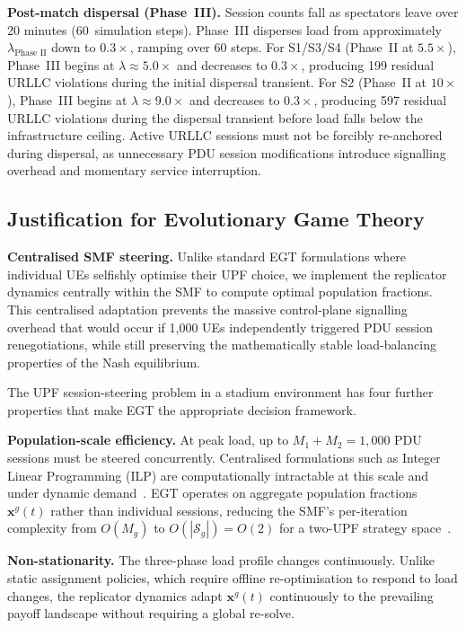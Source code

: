 \documentclass[conference]{IEEEtran}
\begin{document}
\textbf{Post-match dispersal (Phase~III).} Session
counts fall as spectators leave over 20 minutes
(60~simulation steps). Phase~III disperses load from
approximately $\lambda_{\text{Phase~II}}$ down to $0.3\times$,
ramping over 60 steps. For S1/S3/S4 (Phase~II at
$5.5\times$), Phase~III begins at $\lambda \approx 5.0\times$
and decreases to $0.3\times$, producing 199 residual URLLC
violations during the initial dispersal transient. For S2
(Phase~II at $10\times$), Phase~III begins at $\lambda \approx
9.0\times$ and decreases to $0.3\times$, producing 597 residual
URLLC violations during the dispersal transient before load
falls below the infrastructure ceiling. Active
URLLC sessions must not be forcibly re-anchored
during dispersal, as unnecessary PDU session
modifications introduce signalling overhead and
momentary service interruption.

\subsection{Justification for Evolutionary Game Theory}
\label{sec:egt_justify}

\textbf{Centralised SMF steering.}
Unlike standard EGT formulations where individual UEs selfishly
optimise their UPF choice, we implement the replicator dynamics
centrally within the SMF to compute optimal population fractions.
This centralised adaptation prevents the massive control-plane
signalling overhead that would occur if 1,000 UEs independently
triggered PDU session renegotiations, while still preserving
the mathematically stable load-balancing properties of the
Nash equilibrium.

The UPF session-steering problem in a stadium environment
has four further properties that make EGT the appropriate
decision framework.

\textbf{Population-scale efficiency.} At peak
load, up to $M_1 + M_2 = 1{,}000$ PDU sessions must be
steered concurrently. Centralised formulations such as
Integer Linear Programming (ILP) are computationally
intractable at this scale and under dynamic
demand~\cite{LeyvaUPC2023}. EGT operates on aggregate
population fractions $\mathbf{x}^g(t)$ rather than
individual sessions, reducing the SMF's per-iteration
complexity from $O(M_g)$ to $O(|\mathcal{S}_g|) = O(2)$
for a two-UPF strategy space~\cite{Alevizaki2021upf}.

\textbf{Non-stationarity.} The three-phase load profile
changes continuously. Unlike static assignment policies,
which require offline re-optimisation to respond to load
changes, the replicator dynamics adapt $\mathbf{x}^g(t)$
continuously to the prevailing payoff landscape without
requiring a global re-solve.
\end{document}
